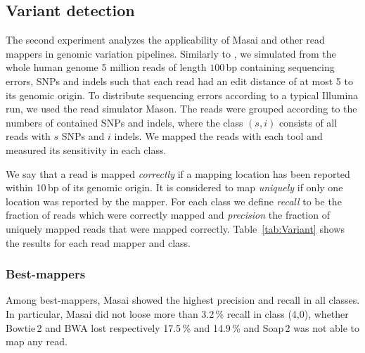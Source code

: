 \begin{table*}[t]
  \caption[Rabema results]
  {
  \label{tab:Rabema}
    {\bfseries Rabema results.}
    Rabema scores in percent
    (average fraction of edit distance locations reported per read).
    Large numbers show total scores in each Rabema category and small numbers show the category scores separately for reads with $\bigl(\begin{smallmatrix}\mbox{\tiny 0}&\mbox{\tiny 1}&\mbox{\tiny 2}\\\mbox{\tiny 3}&\mbox{\tiny 4}&\mbox{\tiny 5}\end{smallmatrix}\bigr)$ errors.
    }
  \vspace{-3mm}
  \center
  \sffamily
  \resizebox{0.95\textwidth}{!}
  {
	\renewcommand{\tabcolsep}{0.8ex}
	
  }
\end{table*}

\subsection{Variant detection}

The second experiment analyzes the applicability of Masai and other read mappers in genomic variation pipelines.
Similarly to \citep{Shrimp2}, we simulated from the whole human genome 5 million reads of length $100$\,bp containing sequencing errors, SNPs and indels such that each read had an edit distance of at most 5 to its genomic origin.
To distribute sequencing errors according to a typical Illumina run, we used the read simulator Mason.
The reads were grouped according to the numbers of contained SNPs and indels, where the class $(s,i)$ consists of all reads with $s$ SNPs and $i$ indels.
We mapped the reads with each tool and measured its sensitivity in each class.

We say that a read is mapped \emph{correctly} if a mapping location has been reported within 10\,bp of its genomic origin.
It is considered to map \emph{uniquely} if only one location was reported by the mapper.
For each class we define \emph{recall} to be the fraction of reads which were correctly mapped and \emph{precision} the fraction of uniquely mapped reads that were mapped correctly.
Table~\ref{tab:Variant} shows the results for each read mapper and class.

\subsubsection{Best-mappers}
Among best-mappers, Masai showed the highest precision and recall in all classes.
In particular, Masai did not loose more than 3.2\,\% recall in class (4,0), whether Bowtie\,2 and BWA lost respectively 17.5\,\% and 14.9\,\% and Soap\,2 was not able to map any read.


